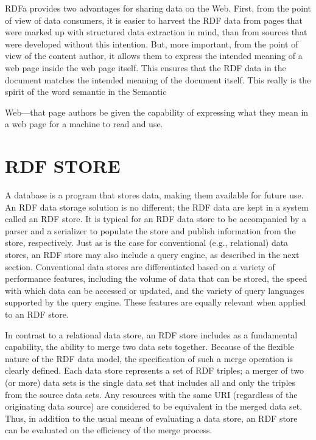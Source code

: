 RDFa provides two advantages for sharing data on the Web. First, from
the point of view of data consumers, it is easier to harvest the RDF
data from pages that were marked up with structured data extraction in
mind, than from sources that were developed without this intention. But,
more important, from the point of view of the content author, it allows
them to express the intended meaning of a web page inside the web page
itself. This ensures that the RDF data in the document matches the
intended meaning of the document itself. This really is the spirit of
the word semantic in the Semantic

Web---that page authors be given the capability of expressing what they
mean in a web page for a machine to read and use.

\section{RDF STORE}

A database is a program that stores data, making them available for
future use. An RDF data storage solution is no different; the RDF data
are kept in a system called an RDF store. It is typical for an RDF data
store to be accompanied by a parser and a serializer to populate the
store and publish information from the store, respectively. Just as is
the case for conventional (e.g., relational) data stores, an RDF store
may also include a query engine, as described in the next section.
Conventional data stores are differentiated based on a variety of
performance features, including the volume of data that can be stored,
the speed with which data can be accessed or updated, and the variety of
query languages supported by the query engine. These features are
equally relevant when applied to an RDF store.

In contrast to a relational data store, an RDF store includes as a
fundamental capability, the ability to merge two data sets together.
Because of the flexible nature of the RDF data model, the specification
of such a merge operation is clearly defined. Each data store represents
a set of RDF triples; a merger of two (or more) data sets is the single
data set that includes all and only the triples from the source data
sets. Any resources with the same URI (regardless of the originating
data source) are considered to be equivalent in the merged data set.
Thus, in addition to the usual means of evaluating a data store, an RDF
store can be evaluated on the efficiency of the merge process.

